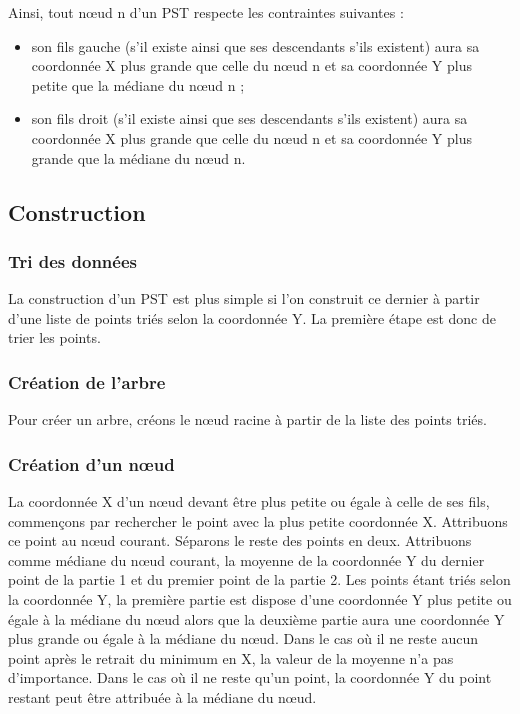 \documentclass[10pt,a4paper]{article}
\begin{document}
Ainsi, tout nœud n d'un PST respecte les contraintes suivantes :
\begin{itemize}
	\item son fils gauche (s'il existe ainsi que ses descendants s'ils existent) aura sa coordonnée X plus grande que celle du nœud n et sa coordonnée Y plus petite que la médiane du nœud n ;
	\item son fils droit (s'il existe ainsi que ses descendants s'ils existent) aura sa coordonnée X plus grande que celle du nœud n et sa coordonnée Y plus grande que la médiane du nœud n.
\end{itemize}

\subsection{Construction}

\subsubsection{Tri des données}
La construction d'un PST est plus simple si l'on construit ce dernier à partir d'une liste de points triés selon la coordonnée Y. La première étape est donc de trier les points.

\subsubsection{Création de l'arbre}
Pour créer un arbre, créons le nœud racine à partir de la liste des points triés.

\subsubsection{Création d'un nœud}
La coordonnée X d'un nœud devant être plus petite ou égale à celle de ses fils, commençons par rechercher le point avec la plus petite coordonnée X. Attribuons ce point au nœud courant. Séparons le reste des points en deux. Attribuons comme médiane du nœud courant, la moyenne de la coordonnée Y du dernier point de la partie 1 et du premier point de la partie 2. Les points étant triés selon la coordonnée Y, la première partie est dispose d'une coordonnée Y plus petite ou égale à la médiane du nœud alors que la deuxième partie aura une coordonnée Y plus grande ou égale à la médiane du nœud. Dans le cas où il ne reste aucun point après le retrait du minimum en X, la valeur de la moyenne n'a pas d'importance. Dans le cas où il ne reste qu'un point, la coordonnée Y du point restant peut être attribuée à la médiane du nœud.
\end{document}
